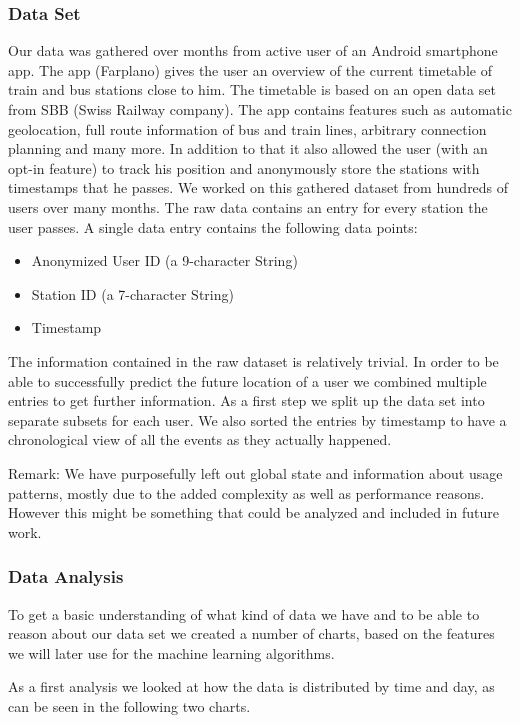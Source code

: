 \subsubsection{Data Set}
Our data was gathered over months from active user of an Android smartphone app. The app (Farplano) gives the user an overview of the current timetable of train and bus stations close to him. The timetable is based on an open data set from SBB (Swiss Railway company). The app contains features such as automatic geolocation, full route information of bus and train lines, arbitrary connection planning and many more. In addition to that it also allowed the user (with an opt-in feature) to track his position and anonymously store the stations with timestamps that he passes. We worked on this gathered dataset from hundreds of users over many months. The raw data contains an entry for every station the user passes. A single data entry contains the following data points:
\begin{itemize}
	\item Anonymized User ID (a 9-character String)
	\item Station ID (a 7-character String)
	\item Timestamp
\end{itemize}
The information contained in the raw dataset is relatively trivial. In order to be able to successfully predict the future location of a user we combined multiple entries to get further information. As a first step we split up the data set into separate subsets for each user. We also sorted the entries by timestamp to have a chronological view of all the events as they actually happened.

Remark: We have purposefully left out global state and information about usage patterns, mostly due to the added complexity as well as performance reasons. However this might be something that could be analyzed and included in future work. 

\subsubsection{Data Analysis}
To get a basic understanding of what kind of data we have and to be able to reason about our data set we created a number of charts, based on the features we will later use for the machine learning algorithms. 

As a first analysis we looked at how the data is distributed by time and day, as can be seen in the following two charts.


